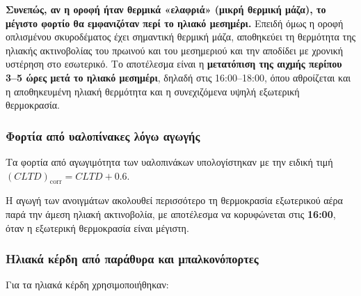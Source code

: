 \documentclass[12pt,a4paper]{article}
\begin{document}
\textbf{Συνεπώς, αν η οροφή ήταν θερμικά «ελαφριά» (μικρή θερμική μάζα), το
μέγιστο φορτίο θα εμφανιζόταν περί το ηλιακό μεσημέρι.} Επειδή όμως η οροφή
οπλισμένου σκυροδέματος έχει σημαντική θερμική μάζα, αποθηκεύει τη θερμότητα της
ηλιακής ακτινοβολίας του πρωινού και του μεσημεριού και την αποδίδει με χρονική
υστέρηση στο εσωτερικό. Το αποτέλεσμα είναι η \textbf{μετατόπιση της αιχμής
περίπου 3--5 ώρες μετά το ηλιακό μεσημέρι}, δηλαδή στις 16:00--18:00, όπου
αθροίζεται και η αποθηκευμένη ηλιακή θερμότητα και η συνεχιζόμενα υψηλή
εξωτερική θερμοκρασία.

\subsubsection{Φορτία από υαλοπίνακες λόγω αγωγής}

Τα φορτία από αγωγιμότητα των υαλοπινάκων υπολογίστηκαν με την ειδική τιμή
\((CLTD)_{\text{corr}} = CLTD + 0.6\).

\begin{table}[H]
\centering
\caption{Αισθητά φορτία από υαλοπίνακες λόγω αγωγής}
\end{table}

Η αγωγή των ανοιγμάτων ακολουθεί περισσότερο τη θερμοκρασία εξωτερικού αέρα παρά την
άμεση ηλιακή ακτινοβολία, με αποτέλεσμα να κορυφώνεται στις \textbf{16:00}, όταν η
εξωτερική θερμοκρασία είναι μέγιστη.

\subsubsection{Ηλιακά κέρδη από παράθυρα και μπαλκονόπορτες}

Για τα ηλιακά κέρδη χρησιμοποιήθηκαν:
\end{document}
